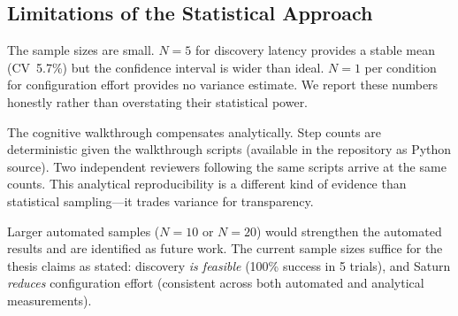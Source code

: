 \subsection{Limitations of the Statistical Approach}

The sample sizes are small. $N=5$ for discovery latency provides a stable mean (CV~5.7\%) but the confidence interval is wider than ideal. $N=1$ per condition for configuration effort provides no variance estimate. We report these numbers honestly rather than overstating their statistical power.

The cognitive walkthrough compensates analytically. Step counts are deterministic given the walkthrough scripts (available in the repository as Python source). Two independent reviewers following the same scripts arrive at the same counts. This analytical reproducibility is a different kind of evidence than statistical sampling---it trades variance for transparency.

Larger automated samples ($N=10$ or $N=20$) would strengthen the automated results and are identified as future work. The current sample sizes suffice for the thesis claims as stated: discovery \textit{is feasible} (100\% success in 5 trials), and Saturn \textit{reduces} configuration effort (consistent across both automated and analytical measurements).
